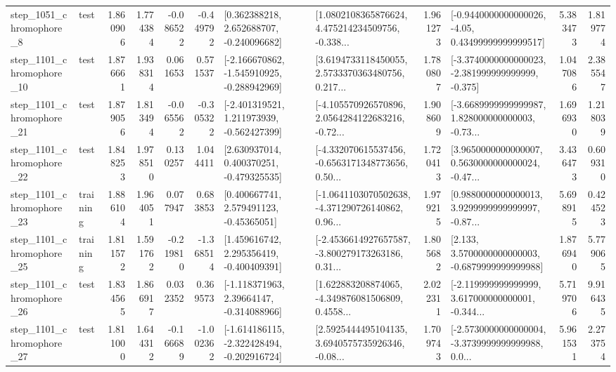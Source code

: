 \begin{tabular}{llrrrrllrlrr}
  step\_1051\_chromophore\_8 &      test &      1.860906 &    1.774384 &     -0.086522 & -0.449792 &    [0.362388218, 2.652688707, -0.240096682] &  [1.0802108365876624, 4.475214234509756, -0.338... &       1.961273 &  [-0.9440000000000026, -4.05, 0.43499999999999517] &            5.383473 &          1.819774 \\
 step\_1101\_chromophore\_10 &      test &      1.876661 &    1.938314 &      0.061653 &  0.571537 &  [-2.166670862, -1.545910925, -0.288942969] &  [3.6194733118450055, 2.5733370363480756, 0.217... &       1.780807 &  [-3.3740000000000023, -2.381999999999999, -0.375] &            1.047086 &          2.385547 \\
 step\_1101\_chromophore\_21 &      test &      1.879056 &    1.813494 &     -0.065562 & -0.305322 &   [-2.401319521, 1.211973939, -0.562427399] &  [-4.105570926570896, 2.0564284122683216, -0.72... &       1.908609 &  [-3.6689999999999987, 1.828000000000003, -0.73... &            1.696930 &          1.218039 \\
 step\_1101\_chromophore\_22 &      test &      1.848253 &    1.978510 &      0.130257 &  1.044411 &    [2.630937014, 0.400370251, -0.479325535] &  [-4.332070615537456, -0.6563171348773656, 0.50... &       1.720413 &  [3.9650000000000007, 0.5630000000000024, -0.47... &            3.436473 &          0.609310 \\
 step\_1101\_chromophore\_23 &  training &      1.886104 &    1.964051 &      0.077947 &  0.683853 &     [0.400667741, 2.579491123, -0.45365051] &  [-1.0641103070502638, -4.371290726140862, 0.96... &       1.979215 &  [0.9880000000000013, 3.9299999999999997, -0.87... &            5.698915 &          0.424523 \\
 step\_1101\_chromophore\_25 &  training &      1.811572 &    1.591762 &     -0.219810 & -1.368514 &    [1.459616742, 2.295356419, -0.400409391] &  [-2.4536614927657587, -3.800279173263186, 0.31... &       1.805682 &   [2.133, 3.5700000000000003, -0.6879999999999988] &            1.876940 &          5.779065 \\
 step\_1101\_chromophore\_26 &      test &      1.834565 &    1.866917 &      0.032352 &  0.369573 &    [-1.118371963, 2.39664147, -0.314088966] &  [1.622883208874065, -4.349876081506809, 0.4558... &       2.022311 &  [-2.119999999999999, 3.617000000000001, -0.344... &            5.719706 &          9.916435 \\
 step\_1101\_chromophore\_27 &      test &      1.811000 &    1.644312 &     -0.166689 & -1.002362 &  [-1.614186115, -2.322428494, -0.202916724] &  [2.5925444495104135, 3.6940575735926346, -0.08... &       1.709743 &  [-2.5730000000000004, -3.3739999999999988, 0.0... &            5.961531 &          2.273754 \\

\end{tabular}
